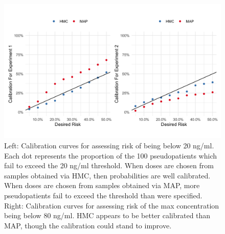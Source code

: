 \begin{figure}[h!]
	\centering
	\includegraphics[width=\linewidth]{figs/fig8.png}
	\caption{Left: Calibration curves for assessing risk of being below 20 ng/ml.  Each dot represents the proportion of the 100 pseudopatients which fail to exceed the 20 ng/ml threshold.  When doses are chosen from samples obtained via HMC, then probabilities are well calibrated. When doses are chosen from samples obtained via MAP, more pseudopatients fail to exceed the threshold than were specified.  Right: Calibration curves for assessing risk of the max concentration being below 80 ng/ml. HMC appears to be better calibrated than MAP, though the calibration could stand to improve.}
	\label{fig:fig8}
\end{figure}



